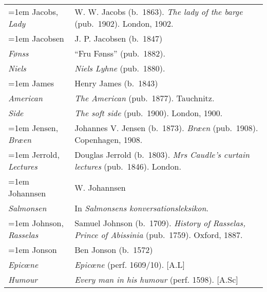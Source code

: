 \begin{xltabular}{\textwidth}{ lQ }
\hangindent=1em  Jacobs, \textit{Lady} & W. W. Jacobs (b.~1863). \textit{The lady of the barge} (pub.~1902). London, 1902. \\

\hangindent=1em  Jacobsen & J. P. Jacobsen (b.~1847) \\
\hspace{1em}\textit{Fønss} & ``Fru Fønss'' (pub.~1882). \\
\hspace{1em}\textit{Niels} & \textit{Niels Lyhne} (pub.~1880). \\

\hangindent=1em  James & Henry James (b.~1843) \\
\hspace{1em}\textit{American} & \textit{The American} (pub.~1877). Tauchnitz. \\
\hspace{1em}\textit{Side} & \textit{The soft side} (pub.~1900). London, 1900.  \\

\hangindent=1em  Jensen, \textit{Bræen} & Johannes V. Jensen (b.~1873). \textit{Bræen} (pub.~1908). Copenhagen, 1908.\\

\hangindent=1em  Jerrold, \textit{Lectures} & Douglas Jerrold (b.~1803). \textit{Mrs Caudle's curtain lectures} (pub.~1846). London. \\

\hangindent=1em  Johannsen & W. Johannsen\\
\hspace{1em}\textit{Salmonsen} & In \textit{Salmonsens konversationsleksikon}.\\ %

\hangindent=1em  Johnson, \textit{Rasselas} & Samuel Johnson (b.~1709). \textit{History of Rasselas, Prince of Abissinia} (pub.~1759). Oxford, 1887.  \\

\hangindent=1em  Jonson & Ben Jonson (b.~1572) \\
\hspace{1em}\textit{Epicœne} & \textit{Epicœne} (perf. 1609/10). [A.L] \\ %
\hspace{1em}\textit{Humour} & \textit{Every man in his humour} (perf. 1598). [A.Sc] \\ %


\end{xltabular}
